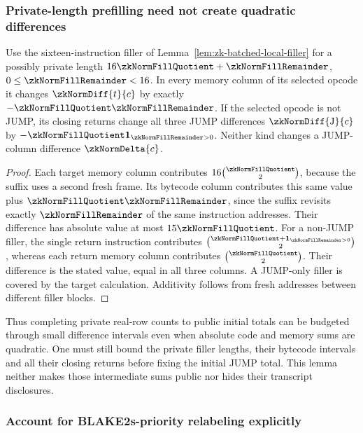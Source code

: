 \subsubsection{Private-length prefilling need not create quadratic differences}

\begin{lemma}\label{lem:zk-prefill-count-differences}
Use the sixteen-instruction filler of Lemma~\ref{lem:zk-batched-local-filler} for a possibly private length $16\zkNormFillQuotient+\zkNormFillRemainder$, $0\le\zkNormFillRemainder<16$. In every memory column of its selected opcode it changes $\zkNormDiff{t}{c}$ by exactly $-\zkNormFillQuotient\zkNormFillRemainder$. If the selected opcode is not JUMP, its closing returns change all three JUMP differences $\zkNormDiff{\mathrm J}{c}$ by $-\zkNormFillQuotient\mathbf 1_{\zkNormFillRemainder>0}$. Neither kind changes a JUMP-column difference $\zkNormDelta{c}$.
\end{lemma}
\begin{proof}
Each target memory column contributes $16\binom{\zkNormFillQuotient}{2}$, because the suffix uses a second fresh frame. Its bytecode column contributes this same value plus $\zkNormFillQuotient\zkNormFillRemainder$, since the suffix revisits exactly $\zkNormFillRemainder$ of the same instruction addresses. Their difference has absolute value at most $15\zkNormFillQuotient$. For a non-JUMP filler, the single return instruction contributes $\binom{\zkNormFillQuotient+\mathbf 1_{\zkNormFillRemainder>0}}{2}$, whereas each return memory column contributes $\binom{\zkNormFillQuotient}{2}$. Their difference is the stated value, equal in all three columns. A JUMP-only filler is covered by the target calculation. Additivity follows from fresh addresses between different filler blocks.
\end{proof}

Thus completing private real-row counts to public initial totals can be budgeted through small difference intervals even when absolute code and memory sums are quadratic. One must still bound the private filler lengths, their bytecode intervals and all their closing returns before fixing the initial JUMP total. This lemma neither makes those intermediate sums public nor hides their transcript disclosures.

\subsubsection{Account for BLAKE2s-priority relabeling explicitly}

